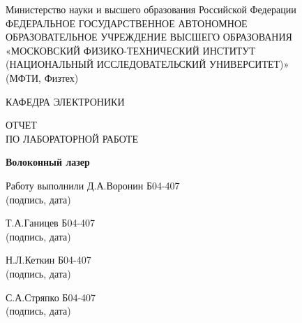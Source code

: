 \documentclass[12pt]{article}
\begin{document}
\thispagestyle{empty}

\begin{center}

\large
Министерство науки и высшего образования Российской Федерации \\
\large
ФЕДЕРАЛЬНОЕ ГОСУДАРСТВЕННОЕ АВТОНОМНОЕ \\
ОБРАЗОВАТЕЛЬНОЕ УЧРЕЖДЕНИЕ ВЫСШЕГО ОБРАЗОВАНИЯ \\
\large
«МОСКОВСКИЙ ФИЗИКО-ТЕХНИЧЕСКИЙ ИНСТИТУТ \\
(НАЦИОНАЛЬНЫЙ ИССЛЕДОВАТЕЛЬСКИЙ УНИВЕРСИТЕТ)» \\
(МФТИ, Физтех)

\vspace{3cm}

\large
КАФЕДРА ЭЛЕКТРОНИКИ

\vspace{0.7cm}

\Large
ОТЧЕТ \\
ПО ЛАБОРАТОРНОЙ РАБОТЕ

\vspace{0.7cm}

\Large
\textbf{Волоконный лазер}

\vfill

\vspace{1.5cm}

\large

\noindent
Работу выполнили \hfill \underline{\hspace{6cm}} Д.А.Воронин Б04-407 \\
\hfill {\small (подпись, дата)}\par %


\noindent
\hfill \underline{\hspace{6cm}} Т.А.Ганицев Б04-407 \\
\hfill {\small (подпись, дата)}\par %

\noindent
\hfill \underline{\hspace{6cm}} Н.Л.Кеткин Б04-407 \\
\hfill {\small (подпись, дата)}\par %

\noindent
\hfill \underline{\hspace{6cm}} С.А.Стряпко Б04-407 \\
\hfill {\small (подпись, дата)}\par %


\end{center}
\end{document}
